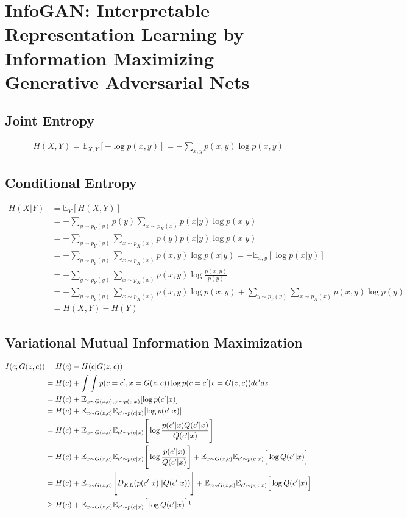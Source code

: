 \section{InfoGAN: Interpretable Representation Learning by Information Maximizing Generative Adversarial Nets}
\label{sec:q}

\subsection{Joint Entropy}
\begin{align*}
H(X,Y) = \mathbb{E}_{X,Y}[-\log p(x,y)] = -\sum_{x,y}p(x,y)\log p(x,y)
\end{align*}
\subsection{Conditional Entropy}
\begin{align*}
H(X|Y) &= \mathbb{E}_{Y}[H(X,Y)] \\
&= -\sum_{y\sim p_Y(y)}p(y)\sum_{x\sim p_X(x)}p(x|y)\log p(x|y)\\
& = -\sum_{y\sim p_Y(y)}\sum_{x\sim p_X(x)}p(y)p(x|y)\log p(x|y)\\
& = -\sum_{y\sim p_Y(y)}\sum_{x\sim p_X(x)}p(x,y)\log p(x|y) = -\mathbb{E}_{x,y}[\log p(x|y)]\\
& = -\sum_{y\sim p_Y(y)}\sum_{x\sim p_X(x)}p(x,y)\log \frac{p(x,y)}{p(y)}\\
& = -\sum_{y\sim p_Y(y)}\sum_{x\sim p_X(x)}p(x,y)\log p(x,y) + \sum_{y\sim p_Y(y)}\sum_{x\sim p_X(x)}p(x,y)\log p(y)\\
& = H(X,Y) - H(Y)
\end{align*}
\subsection{Variational Mutual Information Maximization}
\begin{align*}
I(c;G(z,c)) &= H(c) - H(c|G(z,c))\\
& = H(c) + \int\int p(c=c',x=G(z,c))\log p(c=c'|x=G(z,c)) dc' dz\\
& = H(c) + \mathbb{E}_{x\sim G(z,c),c'\sim p(c|x)}[\log p(c'|x)]\\
& = H(c) + \mathbb{E}_{x\sim G(z,c)}\mathbb{E}_{c'\sim p(c|x)}[\log p(c'|x)]\\
& = H(c) + \mathbb{E}_{x\sim G(z,c)}\mathbb{E}_{c'\sim p(c|x)}\Bigg[\log \frac{p(c'|x)Q(c'|x)}{Q(c'|x)}\Bigg]\\
& = H(c) + \mathbb{E}_{x\sim G(z,c)}\mathbb{E}_{c'\sim p(c|x)}\Bigg[\log \frac{p(c'|x)}{Q(c'|x)}\Bigg] + \mathbb{E}_{x\sim G(z,c)}\mathbb{E}_{c'\sim p(c|x)}\Big[\log Q(c'|x)\Big]\\
& = H(c) + \mathbb{E}_{x\sim G(z,c)}\Bigg[D_{KL}(p(c'|x)||Q(c'|x))\Bigg] + \mathbb{E}_{x\sim G(z,c)}\mathbb{E}_{c'\sim p(c|x)}\Big[\log Q(c'|x)\Big]\\
& \geq H(c) + \mathbb{E}_{x\sim G(z,c)}\mathbb{E}_{c'\sim p(c|x)}\Big[\log Q(c'|x)\Big] \footnotemark
\end{align*}

